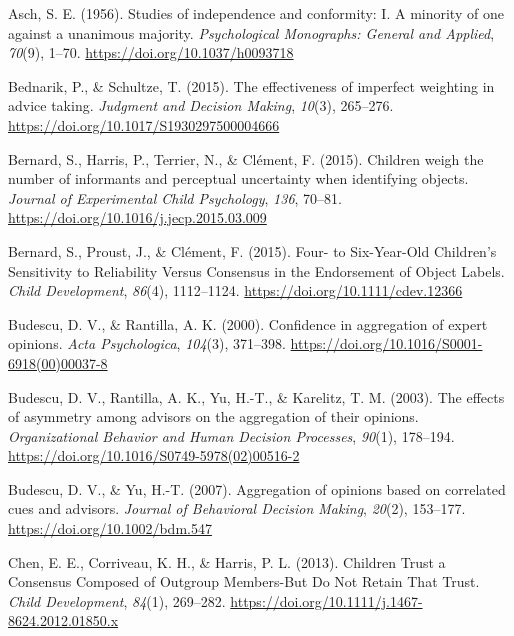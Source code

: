 \documentclass[
  doc,floatsintext]{apa6}
\newlength{\cslhangindent}
\newenvironment{CSLReferences}[2] %
 {\begin{list}{}{%
  \setlength{\itemindent}{0pt}
  \setlength{\leftmargin}{0pt}
  \setlength{\parsep}{0pt}
  \ifodd #1
   \setlength{\leftmargin}{\cslhangindent}
   \setlength{\itemindent}{-1\cslhangindent}
  \fi
  \setlength{\itemsep}{#2\baselineskip}}}
 {\end{list}}
\begin{document}
\label{refs}
\begin{CSLReferences}{1}{0}
Asch, S. E. (1956). Studies of independence and conformity: I. A minority of one against a unanimous majority. \emph{Psychological Monographs: General and Applied}, \emph{70}(9), 1--70. \url{https://doi.org/10.1037/h0093718}

Bednarik, P., \& Schultze, T. (2015). The effectiveness of imperfect weighting in advice taking. \emph{Judgment and Decision Making}, \emph{10}(3), 265--276. \url{https://doi.org/10.1017/S1930297500004666}

Bernard, S., Harris, P., Terrier, N., \& Clément, F. (2015). Children weigh the number of informants and perceptual uncertainty when identifying objects. \emph{Journal of Experimental Child Psychology}, \emph{136}, 70--81. \url{https://doi.org/10.1016/j.jecp.2015.03.009}

Bernard, S., Proust, J., \& Clément, F. (2015). Four- to Six-Year-Old Children's Sensitivity to Reliability Versus Consensus in the Endorsement of Object Labels. \emph{Child Development}, \emph{86}(4), 1112--1124. \url{https://doi.org/10.1111/cdev.12366}

Budescu, D. V., \& Rantilla, A. K. (2000). Confidence in aggregation of expert opinions. \emph{Acta Psychologica}, \emph{104}(3), 371--398. \url{https://doi.org/10.1016/S0001-6918(00)00037-8}

Budescu, D. V., Rantilla, A. K., Yu, H.-T., \& Karelitz, T. M. (2003). The effects of asymmetry among advisors on the aggregation of their opinions. \emph{Organizational Behavior and Human Decision Processes}, \emph{90}(1), 178--194. \url{https://doi.org/10.1016/S0749-5978(02)00516-2}

Budescu, D. V., \& Yu, H.-T. (2007). Aggregation of opinions based on correlated cues and advisors. \emph{Journal of Behavioral Decision Making}, \emph{20}(2), 153--177. \url{https://doi.org/10.1002/bdm.547}

Chen, E. E., Corriveau, K. H., \& Harris, P. L. (2013). Children Trust a Consensus Composed of Outgroup Members-But Do Not Retain That Trust. \emph{Child Development}, \emph{84}(1), 269--282. \url{https://doi.org/10.1111/j.1467-8624.2012.01850.x}


\end{CSLReferences}
\end{document}
